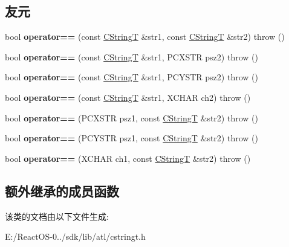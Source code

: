 \subsection*{友元}
\begin{DoxyCompactItemize}
\item 
\mbox{\label{class_a_t_l_1_1_c_string_t_afed93f1eaa15fe3d3a18df0ada0d4906}} 
bool {\bfseries operator==} (const \hyperlink{class_a_t_l_1_1_c_string_t}{C\+StringT} \&str1, const \hyperlink{class_a_t_l_1_1_c_string_t}{C\+StringT} \&str2)  throw ()
\item 
\mbox{\label{class_a_t_l_1_1_c_string_t_a5f1559db26712b2611c80280009f5659}} 
bool {\bfseries operator==} (const \hyperlink{class_a_t_l_1_1_c_string_t}{C\+StringT} \&str1, P\+C\+X\+S\+TR psz2)  throw ()
\item 
\mbox{\label{class_a_t_l_1_1_c_string_t_ae9eea78e4fab35a62e4e7aa3ece77258}} 
bool {\bfseries operator==} (const \hyperlink{class_a_t_l_1_1_c_string_t}{C\+StringT} \&str1, P\+C\+Y\+S\+TR psz2)  throw ()
\item 
\mbox{\label{class_a_t_l_1_1_c_string_t_a436e6534e124c1c4ccf5bfcca3615d03}} 
bool {\bfseries operator==} (const \hyperlink{class_a_t_l_1_1_c_string_t}{C\+StringT} \&str1, X\+C\+H\+AR ch2)  throw ()
\item 
\mbox{\label{class_a_t_l_1_1_c_string_t_aa7b10136b28c143c82a39343a66c05e2}} 
bool {\bfseries operator==} (P\+C\+X\+S\+TR psz1, const \hyperlink{class_a_t_l_1_1_c_string_t}{C\+StringT} \&str2)  throw ()
\item 
\mbox{\label{class_a_t_l_1_1_c_string_t_a675cce27b695c7f18efd94fe3d40e62a}} 
bool {\bfseries operator==} (P\+C\+Y\+S\+TR psz1, const \hyperlink{class_a_t_l_1_1_c_string_t}{C\+StringT} \&str2)  throw ()
\item 
\mbox{\label{class_a_t_l_1_1_c_string_t_a7f1d4e5a890c34d3ee4f92c87661cb58}} 
bool {\bfseries operator==} (X\+C\+H\+AR ch1, const \hyperlink{class_a_t_l_1_1_c_string_t}{C\+StringT} \&str2)  throw ()
\end{DoxyCompactItemize}
\subsection*{额外继承的成员函数}


该类的文档由以下文件生成\+:\begin{DoxyCompactItemize}
\item 
E\+:/\+React\+O\+S-\/0../sdk/lib/atl/cstringt.\+h\end{DoxyCompactItemize}
